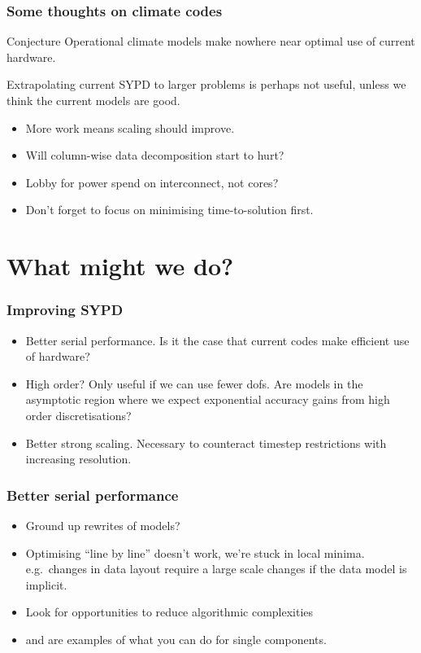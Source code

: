 \documentclass[presentation]{beamer}
\begin{document}
\begin{frame}
  \frametitle{Some thoughts on climate codes}

  \begin{block}{Conjecture}
    Operational climate models make nowhere near optimal use of current
    hardware.

    Extrapolating current SYPD to larger problems is perhaps not
    useful, unless we think the current models are good.
  \end{block}

  \begin{itemize}
  \item More work means scaling should improve.
  \item Will column-wise data decomposition start to hurt?
  \item Lobby for power spend on interconnect, not cores?
  \item Don't forget to focus on minimising time-to-solution first.
  \end{itemize}
\end{frame}

\section{What might we do?}

\begin{frame}
  \frametitle{Improving SYPD}

  \begin{itemize}
  \item Better serial performance.  Is it the case that current codes
    make efficient use of hardware?

  \item High order?  Only useful if we can use fewer dofs.  Are models in
    the asymptotic region where we expect exponential accuracy gains
    from high order discretisations?

  \item Better strong scaling.  Necessary to counteract timestep
    restrictions with increasing resolution.
  \end{itemize}
\end{frame}

\begin{frame}
  \frametitle{Better serial performance}

  \begin{itemize}
  \item Ground up rewrites of models?

  \item Optimising ``line by line'' doesn't work, we're stuck
    in local minima.  e.g.~changes in data layout require a large
    scale changes if the data model is implicit.
  
  \item Look for opportunities to reduce algorithmic complexities

  \item \textcite{Yang:2016} and \textcite{Rudi:2015} are examples of
    what you can do for single components.
  \end{itemize}
\end{frame}
\end{document}
